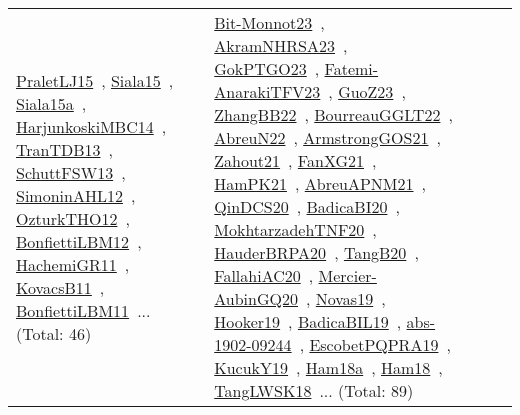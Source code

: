 {\begin{longtable}{lp{3cm}>{\raggedright\arraybackslash}p{6cm}>{\raggedright\arraybackslash}p{6cm}>{\raggedright\arraybackslash}p{8cm}}
\href{../works/PraletLJ15.pdf}{PraletLJ15}~\cite{PraletLJ15}, \href{../works/Siala15.pdf}{Siala15}~\cite{Siala15}, \href{../works/Siala15a.pdf}{Siala15a}~\cite{Siala15a}, \href{../works/HarjunkoskiMBC14.pdf}{HarjunkoskiMBC14}~\cite{HarjunkoskiMBC14}, \href{../works/TranTDB13.pdf}{TranTDB13}~\cite{TranTDB13}, \href{../works/SchuttFSW13.pdf}{SchuttFSW13}~\cite{SchuttFSW13}, \href{../works/SimoninAHL12.pdf}{SimoninAHL12}~\cite{SimoninAHL12}, \href{../works/OzturkTHO12.pdf}{OzturkTHO12}~\cite{OzturkTHO12}, \href{../works/BonfiettiLBM12.pdf}{BonfiettiLBM12}~\cite{BonfiettiLBM12}, \href{../works/HachemiGR11.pdf}{HachemiGR11}~\cite{HachemiGR11}, \href{../works/KovacsB11.pdf}{KovacsB11}~\cite{KovacsB11}, \href{../works/BonfiettiLBM11.pdf}{BonfiettiLBM11}~\cite{BonfiettiLBM11}... (Total: 46) & \href{../works/Bit-Monnot23.pdf}{Bit-Monnot23}~\cite{Bit-Monnot23}, \href{../works/AkramNHRSA23.pdf}{AkramNHRSA23}~\cite{AkramNHRSA23}, \href{../works/GokPTGO23.pdf}{GokPTGO23}~\cite{GokPTGO23}, \href{../works/Fatemi-AnarakiTFV23.pdf}{Fatemi-AnarakiTFV23}~\cite{Fatemi-AnarakiTFV23}, \href{../works/GuoZ23.pdf}{GuoZ23}~\cite{GuoZ23}, \href{../works/ZhangBB22.pdf}{ZhangBB22}~\cite{ZhangBB22}, \href{../works/BourreauGGLT22.pdf}{BourreauGGLT22}~\cite{BourreauGGLT22}, \href{../works/AbreuN22.pdf}{AbreuN22}~\cite{AbreuN22}, \href{../works/ArmstrongGOS21.pdf}{ArmstrongGOS21}~\cite{ArmstrongGOS21}, \href{../works/Zahout21.pdf}{Zahout21}~\cite{Zahout21}, \href{../works/FanXG21.pdf}{FanXG21}~\cite{FanXG21}, \href{../works/HamPK21.pdf}{HamPK21}~\cite{HamPK21}, \href{../works/AbreuAPNM21.pdf}{AbreuAPNM21}~\cite{AbreuAPNM21}, \href{../works/QinDCS20.pdf}{QinDCS20}~\cite{QinDCS20}, \href{../works/BadicaBI20.pdf}{BadicaBI20}~\cite{BadicaBI20}, \href{../works/MokhtarzadehTNF20.pdf}{MokhtarzadehTNF20}~\cite{MokhtarzadehTNF20}, \href{../works/HauderBRPA20.pdf}{HauderBRPA20}~\cite{HauderBRPA20}, \href{../works/TangB20.pdf}{TangB20}~\cite{TangB20}, \href{../works/FallahiAC20.pdf}{FallahiAC20}~\cite{FallahiAC20}, \href{../works/Mercier-AubinGQ20.pdf}{Mercier-AubinGQ20}~\cite{Mercier-AubinGQ20}, \href{../works/Novas19.pdf}{Novas19}~\cite{Novas19}, \href{../works/Hooker19.pdf}{Hooker19}~\cite{Hooker19}, \href{../works/BadicaBIL19.pdf}{BadicaBIL19}~\cite{BadicaBIL19}, \href{../works/abs-1902-09244.pdf}{abs-1902-09244}~\cite{abs-1902-09244}, \href{../works/EscobetPQPRA19.pdf}{EscobetPQPRA19}~\cite{EscobetPQPRA19}, \href{../works/KucukY19.pdf}{KucukY19}~\cite{KucukY19}, \href{../works/Ham18a.pdf}{Ham18a}~\cite{Ham18a}, \href{../works/Ham18.pdf}{Ham18}~\cite{Ham18}, \href{../works/TangLWSK18.pdf}{TangLWSK18}~\cite{TangLWSK18}... (Total: 89)\\

\end{longtable}}
